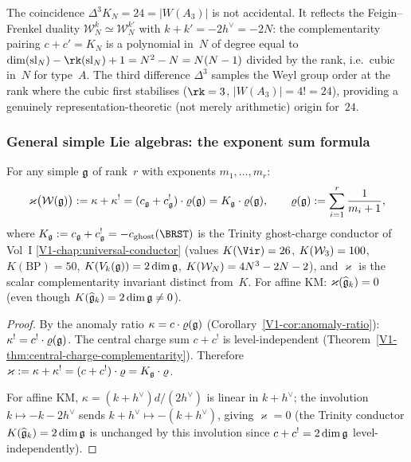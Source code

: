 \begin{remark}
\label{rem:koszul-conductor-24-mechanism}
The coincidence $\Delta^3 K_N = 24 = |W(A_3)|$ is not accidental.
It reflects the Feigin--Frenkel duality $\mathcal{W}_N^k \simeq
\mathcal{W}_N^{k'}$ with $k + k' = -2h^\vee = -2N$: the
complementarity pairing $c + c' = K_N$ is a polynomial in~$N$
of degree equal to $\dim(\mathrm{sl}_N) - \rk(\mathrm{sl}_N)
+ 1 = N^2 - N = N(N-1)$ divided by the rank, i.e.~cubic in~$N$ for
type~$A$. The third difference $\Delta^3$ samples the Weyl group
order at the rank where the cubic first stabilises
($\rk = 3$, $|W(A_3)| = 4! = 24$), providing a genuinely
representation-theoretic (not merely arithmetic) origin for~$24$.
\end{remark}

\subsubsection{General simple Lie algebras: the exponent sum formula}

\begin{theorem}
For any simple $\mathfrak{g}$ of rank~$r$ with exponents $m_1, \ldots, m_r$:
\begin{equation}%
\varkappa\bigl(\mathcal{W}(\fg)\bigr) := \kappa + \kappa^!
= (c_{\fg} + c_{\fg}^!) \cdot \varrho(\fg)
= K_{\fg}\cdot\varrho(\fg),
\qquad
\varrho(\fg) := \sum_{i=1}^r \frac{1}{m_i + 1},
\end{equation}
where $K_{\fg} := c_{\fg} + c_{\fg}^! = -c_{\mathrm{ghost}}(\BRST)$ is
the Trinity ghost-charge conductor of Vol~I
\cref{V1-chap:universal-conductor} (values $K(\Vir) = 26$, $K(\mathcal{W}_3) = 100$,
$K(\mathrm{BP}) = 50$, $K(V_k(\mathfrak{g})) = 2\dim\mathfrak{g}$, $K(\mathcal{W}_N) = 4N^3-2N-2$),
and $\varkappa$ is the scalar complementarity invariant distinct from~$K$.
For affine KM: $\varkappa(\widehat{\mathfrak{g}}_k) = 0$ (even though $K(\widehat{\mathfrak{g}}_k) = 2\dim\mathfrak{g} \ne 0$).
\end{theorem}

\begin{proof}
By the anomaly ratio $\kappa = c \cdot \varrho(\mathfrak{g})$
(Corollary~\ref{V1-cor:anomaly-ratio}): $\kappa^! = c^! \cdot \varrho(\mathfrak{g})$.
The central charge sum $c + c^!$ is level-independent
(Theorem~\ref{V1-thm:central-charge-complementarity}).
Therefore $\varkappa := \kappa + \kappa^! = (c + c^!) \cdot \varrho = K_{\mathfrak{g}} \cdot \varrho$.

For affine KM, $\kappa = (k+h^\vee)d/(2h^\vee)$ is linear in
$k + h^\vee$; the involution $k \mapsto -k - 2h^\vee$ sends
$k + h^\vee \mapsto -(k + h^\vee)$, giving $\varkappa = 0$
(the Trinity conductor $K(\widehat{\mathfrak{g}}_k) = 2\dim\mathfrak{g}$ is unchanged by
this involution since $c + c^! = 2\dim\mathfrak{g}$ level-independently).
\end{proof}

